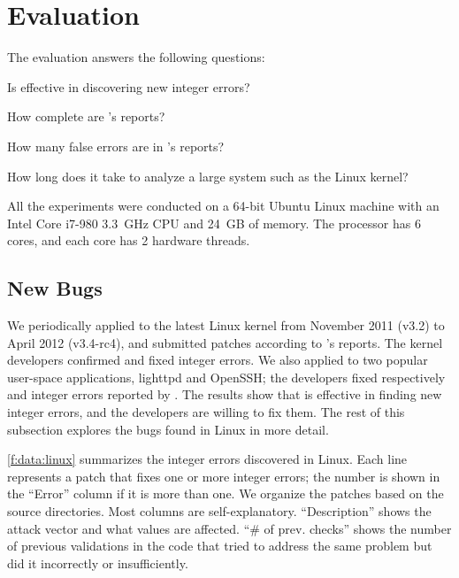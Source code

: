 \section{Evaluation}
\label{s:eval}

The evaluation answers the following questions:
\begin{CompactItemize}
\item
Is \sys effective in discovering new integer errors?
\item
How complete are \sys's reports?
\item
How many false errors are in \sys's reports?
\item
How long does it take \sys to analyze a large system such
as the Linux kernel?
\end{CompactItemize}

All the experiments were conducted on a 64-bit Ubuntu Linux machine
with an Intel Core i7-980 3.3~GHz CPU and 24~GB of memory.  The
processor has 6 cores, and each core has 2 hardware threads.

\subsection{New Bugs}
\label{s:eval:linux}

We periodically applied \sys to the latest Linux kernel
from November 2011 (v3.2) to April 2012 (v3.4-rc4),
and submitted patches according to \sys's reports.
The kernel developers confirmed and fixed \nrbugslinux integer errors.
%
We also applied \sys to two popular user-space applications, lighttpd
and OpenSSH; the developers fixed respectively \nrbugslighttpd and \nrbugsopenssh
integer errors reported by \sys.
%
The results show that \sys is effective in finding new integer
errors, and the developers are willing to fix them.  The rest
of this subsection explores the bugs found in Linux in more detail.

\autoref{f:data:linux}
summarizes the integer errors \sys discovered in Linux.
Each line represents a patch that fixes one or more integer errors; the
number is shown in the ``Error'' column if it is more than one.  We
organize the patches based on the source directories.  Most
columns are self-explanatory.  ``Description'' shows the attack
vector and what values are affected.  ``\# of prev. checks'' shows
the number of previous validations in the code that tried to address the 
same problem but did it incorrectly or insufficiently. 


